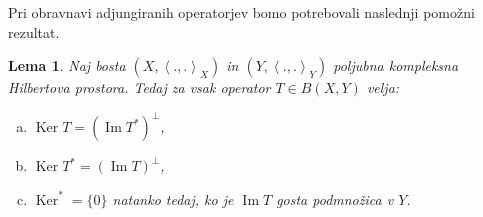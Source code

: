 \documentclass[12pt,a4paper,oneside,fleqn,openany]{book}
\newtheorem{lema}[izrek]{Lema}
\newcommand{\Sp}[2]{\ensuremath{\left<#1, #2\right>}}
\begin{document}
Pri obravnavi adjungiranih operatorjev bomo potrebovali naslednji pomožni rezultat.

\begin{lema}
	\label{lem:adjlast2}
	Naj bosta $(X, \Sp{.}{.}_X)$ in $(Y, \Sp{.}{.}_Y)$ poljubna kompleksna Hilbertova prostora. Tedaj za vsak operator $T\in B(X, Y)$ velja: \begin{enumerate}[a)]
		\item $\operatorname{Ker}T = (\operatorname{Im}T^*)^{\bot}$,
		\item $\operatorname{Ker}T^* = (\operatorname{Im}T)^{\bot}$,
		\item $\operatorname{Ker}^* = \{0\}$ natanko tedaj, ko je $\operatorname{Im}T$ gosta podmnožica v $Y$.
	\end{enumerate}
\end{lema}
\end{document}
